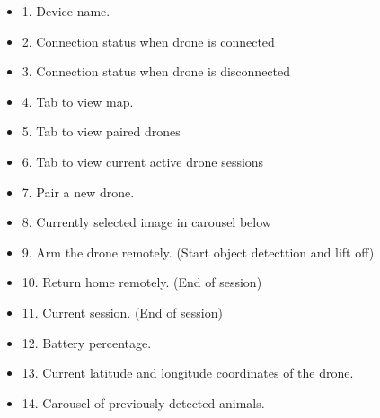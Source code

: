 \begin{itemize}
		\item 1. Device name.
		\item 2. Connection status when drone is connected
		\item 3. Connection status when drone is disconnected
		\item 4. Tab to view map.
		\item 5. Tab to view paired drones
		\item 6. Tab to view current active drone sessions
		\item 7. Pair a new drone.
		\item 8. Currently selected image in carousel below
		\item 9. Arm the drone remotely. (Start object detecttion and lift off)
		\item 10. Return home remotely. (End of session)
		\item 11. Current session. (End of session)
		\item 12. Battery percentage.
		\item 13. Current latitude and longitude coordinates of the drone.
		\item 14. Carousel of previously detected animals.
		
\end{itemize}



